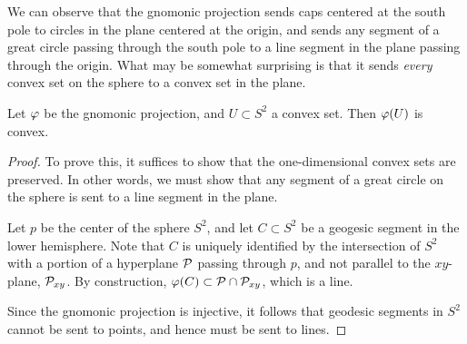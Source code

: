 We can observe that the gnomonic projection sends caps centered at the
south pole to circles in the plane centered at the origin, and sends
any segment of a great circle passing through the south pole to a line
segment in the plane passing through the origin.  What may be somewhat
surprising is that it sends \textit{every} convex set on the sphere to
a convex set in the plane.

\begin{lemma} \label{lem:gnomonic_convex}
	Let $\varphi$ be the gnomonic projection, and $U\subset S^2$ a convex 
	set. Then $\varphi(U)$ is convex.
\end{lemma}
\begin{proof}
	To prove this, it suffices to show that the one-dimensional convex
	sets are preserved. In other words, we must show that any segment of 
	a great circle on the sphere is sent to a line segment in the plane.
	
	Let $p$ be the center of the sphere $S^2$, and let $C\subset S^2$ be
	a geogesic segment in the lower hemisphere.  Note that $C$ is uniquely
	identified by the intersection of $S^2$ with a portion of a hyperplane
	$\mathcal{P}$ passing through $p$, and not parallel to the $xy$-plane,
	$\mathcal{P}_{xy}$. By construction, $\varphi(C)\subset \mathcal{P}\cap
	\mathcal{P}_{xy}$, which is a line. 
	
	Since the gnomonic projection is injective, it follows that 
	geodesic segments in $S^2$ cannot be sent to points, and hence 
	must be sent to lines.
	
\end{proof}


